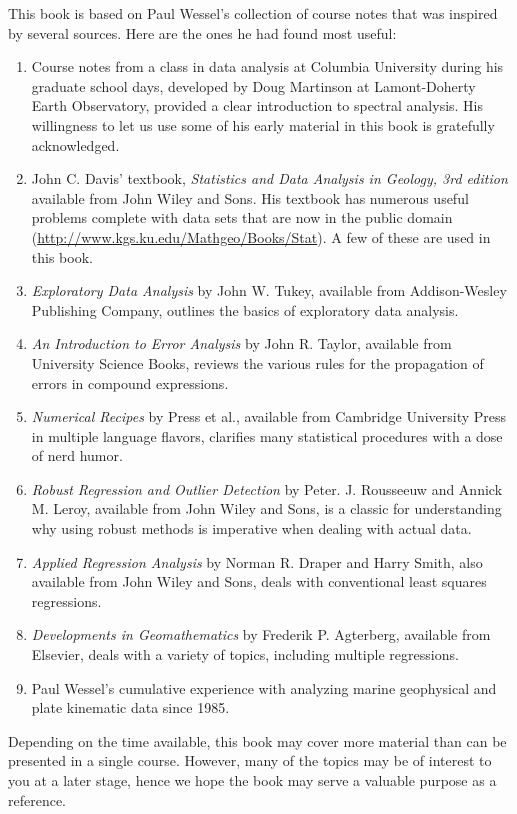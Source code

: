 This book is based on Paul Wessel's collection of course notes that was inspired by several sources.  Here are the ones he had
found most useful:
\begin{enumerate}
\item Course notes from a class in data analysis at Columbia University during his graduate school days, developed by Doug Martinson
	   at Lamont-Doherty Earth Observatory, provided a clear introduction to spectral analysis.  His willingness to
	let us use some of his early material in this book is gratefully acknowledged.
\item John C. Davis' textbook, \emph{Statistics and Data Analysis in Geology, 3rd edition} available from John Wiley and Sons.
   His textbook has numerous useful problems complete with data sets that are now in the public domain
   (\url{http://www.kgs.ku.edu/Mathgeo/Books/Stat}). A few of these are used in this book.
\item \emph{Exploratory Data Analysis} by John W. Tukey, available from Addison-Wesley Publishing Company, outlines the basics
   of exploratory data analysis.
\item \emph{An Introduction to Error Analysis} by John R. Taylor, available from University Science Books, reviews the
   various rules for the propagation of errors in compound expressions.
\item \emph{Numerical Recipes} by Press et al., available from Cambridge University Press in multiple language flavors,
   clarifies many statistical procedures with a dose of nerd humor.
\item \emph{Robust Regression and Outlier Detection} by Peter. J. Rousseeuw and Annick M. Leroy, available from John Wiley and Sons, is a classic
   for understanding why using robust methods is imperative when dealing with actual data.
\item \emph{Applied Regression Analysis} by Norman R. Draper and Harry Smith, also available from John Wiley and Sons, deals with
   conventional least squares regressions.
\item \emph{Developments in Geomathematics} by Frederik P. Agterberg, available from Elsevier, deals with
   a variety of topics, including multiple regressions.
\item Paul Wessel's cumulative experience with analyzing marine geophysical and plate kinematic data since 1985.
\end{enumerate}

Depending on the time available, this book may cover more material than can be presented in a single course.  However,
many of the topics may be of interest to you at a later stage, hence we hope the book may serve a valuable
purpose as a reference.

